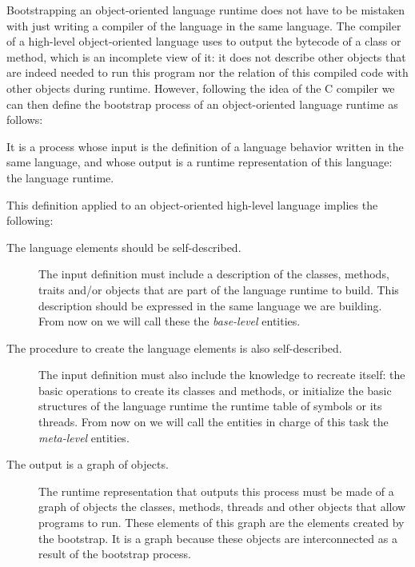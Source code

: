 Bootstrapping an object-oriented language runtime does not have to be mistaken with just writing a compiler of the language in the same language. The compiler of a high-level object-oriented language uses to output the bytecode of a class or method, which is an incomplete view of it: it does not describe other objects that are indeed needed to run this program nor the relation of this compiled code with other objects during runtime. However, following the idea of the C compiler we can then define the bootstrap process of an object-oriented language runtime as follows:

\begin{definition}
It is a process whose input is the definition of a language behavior written in the same language, and whose output is a runtime representation of this language: the language runtime. 
\end{definition}

This definition applied to an object-oriented high-level language implies the following:

\begin{description}

\item[The language elements should be self-described.] The input definition must include a description of the classes, methods, traits and/or objects that are part of the language runtime to build. This description should be expressed in the same language we are building. From now on we will call these the \emph{base-level} entities.

\item[The procedure to create the language elements is also self-described.] The input definition must also include the knowledge to recreate itself: the basic operations to create its classes and methods, or initialize the basic structures of the language runtime \eg the runtime table of symbols or its threads. From now on we will call the entities in charge of this task the \emph{meta-level} entities.

\item[The output is a graph of objects.] The runtime representation that outputs this process must be made of a graph of objects \ie the classes, methods, threads and other objects that allow programs to run. These elements of this graph are the elements created by the bootstrap. It is a graph because these objects are interconnected as a result of the bootstrap process.

\end{description}

